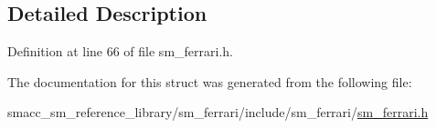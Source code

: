 \subsection{Detailed Description}


Definition at line 66 of file sm\+\_\+ferrari.\+h.



The documentation for this struct was generated from the following file\+:\begin{DoxyCompactItemize}
\item 
smacc\+\_\+sm\+\_\+reference\+\_\+library/sm\+\_\+ferrari/include/sm\+\_\+ferrari/\hyperlink{sm__ferrari_8h}{sm\+\_\+ferrari.\+h}\end{DoxyCompactItemize}

